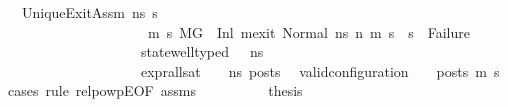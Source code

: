 \begin{isabellebody}
\ \ \ UniqueExitAssm{\isacharcolon}{\kern0pt}\ {\isachardoublequoteopen}{\isasymAnd}ns{}\ s{}{\isacharprime}{\kern0pt}{\isachardot}{\kern0pt}\ \ \ \ \ \ \ \ \ \ \ \ \ \ \ \ \ \ \ \ \isanewline
\ \ \ \ \ \ \ \ \ \ \ \ \ \ \ \ \ \ \ \ {\isacharparenleft}{\kern0pt}{\isasymAnd}\ m{}{\isacharprime}{\kern0pt}\ s{}{\isacharprime}{\kern0pt}{\isachardot}{\kern0pt}\ {\isacharparenleft}{\kern0pt}M{\isacharcomma}{\kern0pt}{\isasymLambda}{\isacharcomma}{\kern0pt}{\isasymGamma}{\isacharcomma}{\kern0pt}{\isasymOmega}{\isacharcomma}{\kern0pt}G{}\ {\isasymturnstile}\ {\isacharparenleft}{\kern0pt}Inl\ m{}{\isacharunderscore}{\kern0pt}exit{\isacharcomma}{\kern0pt}\ Normal\ ns{}{\isacharparenright}{\kern0pt}\ {\isacharminus}{\kern0pt}n{\isasymrightarrow}{\isacharasterisk}{\kern0pt}\ {\isacharparenleft}{\kern0pt}m{}{\isacharprime}{\kern0pt}{\isacharcomma}{\kern0pt}\ s{}{\isacharprime}{\kern0pt}{\isacharparenright}{\kern0pt}\ {\isasymLongrightarrow}\ s{}{\isacharprime}{\kern0pt}\ {\isasymnoteq}\ Failure{\isacharparenright}{\kern0pt}{\isacharparenright}{\kern0pt}\ {\isasymLongrightarrow}\isanewline
\ \ \ \ \ \ \ \ \ \ \ \ \ \ \ \ \ \ \ \ state{\isacharunderscore}{\kern0pt}well{\isacharunderscore}{\kern0pt}typed\ {\isasymLambda}\ {\isasymOmega}\ ns{}\ {\isasymLongrightarrow}\isanewline
\ \ \ \ \ \ \ \ \ \ \ \ \ \ \ \ \ \ \ \ {\isacharparenleft}{\kern0pt}expr{\isacharunderscore}{\kern0pt}all{\isacharunderscore}{\kern0pt}sat\ {\isasymLambda}\ {\isasymGamma}\ {\isasymOmega}\ ns{}{\isacharparenright}{\kern0pt}\ posts{\isachardoublequoteclose}\isanewline
\ \ {\isachardoublequoteopen}valid{\isacharunderscore}{\kern0pt}configuration\ {\isasymLambda}\ {\isasymGamma}\ {\isasymOmega}\ posts\ m{\isacharprime}{\kern0pt}\ s{\isacharprime}{\kern0pt}{\isachardoublequoteclose}\isanewline
%
\isadelimproof
%
\endisadelimproof
%
\isatagproof
{}\isamarkupfalse%
\ {\isacharparenleft}{\kern0pt}cases\ rule{\isacharcolon}{\kern0pt}\ relpowp{\isacharunderscore}{\kern0pt}E{}{\isacharunderscore}{\kern0pt}{}{\isacharbrackleft}{\kern0pt}OF\ assms{\isacharparenleft}{\kern0pt}{}{\isacharparenright}{\kern0pt}{\isacharbrackright}{\kern0pt}{\isacharparenright}{\kern0pt}\isanewline
\ \ \isamarkupfalse%
\ {}\isanewline
\ \ \isamarkupfalse%
\ \isamarkupfalse%
\ {\isacharquery}{\kern0pt}thesis\ \isamarkupfalse%

\end{isabellebody}
